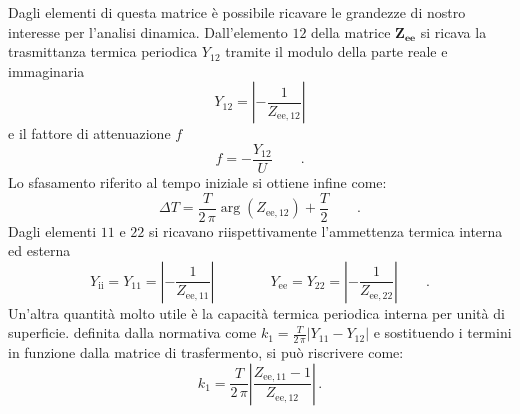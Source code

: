 Dagli elementi di questa matrice è possibile ricavare le grandezze di nostro interesse per l'analisi dinamica.
Dall'elemento {\footnotesize $12$} della matrice $\mathbf{Z_{\text{ee}}}$ si ricava la trasmittanza termica periodica $Y_{12}$ tramite il modulo della parte reale e immaginaria
\begin{equation}
    Y_{12} = \left\lvert -\frac{1}{Z_{\text{ee},12}}\right\rvert 
\end{equation} 
e il fattore di attenuazione $f$
\begin{equation}
    f = -\frac{Y_{12}}{U} \qquad .
\end{equation}
Lo sfasamento riferito al tempo iniziale si ottiene infine come:
\begin{equation}
    \Delta T = \frac{T}{2\,\pi}\arg\left(Z_{\text{ee},12}\right) + \frac{T}{2} \qquad .
\end{equation}
Dagli elementi {\footnotesize $11$} e {\footnotesize $22$} si ricavano riispettivamente l'ammettenza termica interna ed esterna 
\begin{equation}
    Y_{\text{ii}}=Y_{11} = \left\lvert -\frac{1}{Z_{\text{ee},11}}\right\rvert \qquad \qquad
    Y_{\text{ee}}=Y_{22} = \left\lvert -\frac{1}{Z_{\text{ee},22}}\right\rvert \qquad .
\end{equation} 
Un'altra quantità molto utile è la capacità termica periodica interna per unità di superficie. \e definita dalla normativa come $k_1 = \frac{T}{2\,\pi} \left\lvert Y_{11} - Y_{12}\right\rvert$ e sostituendo i termini in funzione dalla matrice di trasfermento, si può riscrivere come:
\begin{equation}
    k_1 = \frac{T}{2\,\pi} \left\lvert \frac{Z_{\text{ee},11} - 1}{Z_{\text{ee},12}}\right\rvert\,.
\end{equation}
